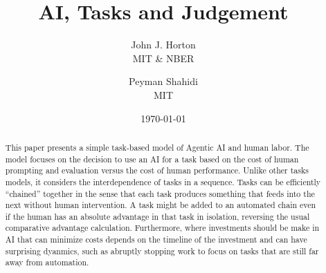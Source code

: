 \documentclass{article}
\theoremstyle{plain}
\theoremstyle{plain}
\begin{document}
\title{AI, Tasks and Judgement}
\author{\normalsize John J. Horton  \\ \normalsize MIT \& NBER  \and \normalsize Peyman Shahidi \\  \normalsize MIT}
\date{\today{}}



\newcommand{\machine}[1]{\langle #1 \rangle}
\newcommand{\human}[1]{( #1 )}
\newcommand{\cost}[1]{C\{ #1 \}}
\newcommand{\costdo}[1]{C_H\{ #1 \}}
\newcommand{\costmanage}[1]{C_M\{ #1 \}}
\newcommand{\timecost}[1]{t_{#1}}
\newcommand{\hccost}[1]{c_{#1}}
\newcommand{\labor}[1]{l_{#1}}
\newcommand{\handofftime}[1]{t_{s#1}}
\newcommand{\humantime}[0]{t_{h}}
\newcommand{\machinetime}[0]{t_{m}}


\newcommand{\topic}[1]{\paragraph{#1}}

\renewcommand{\arraystretch}{1.75} %

\maketitle

\begin{abstract}
\noindent This paper presents a simple task-based model of Agentic AI and human labor.
The model focuses on the decision to use an AI for a task based on the cost of human prompting and evaluation versus the cost of human performance. 
Unlike other tasks models, it considers the interdependence of tasks in a sequence. 
Tasks can be efficiently ``chained'' together in the sense that each task produces something that feeds into the next without human intervention.
A task might be added to an automated chain even if the human has an absolute advantage in that task in isolation, reversing the usual comparative advantage calculation.
Furthermore, where investments should be make in AI that can minimize costs depends on the timeline of the investment and can have surprising dyanmics, such as abruptly stopping work to focus on tasks that are still far away from automation.
\end{abstract}
\end{document}
